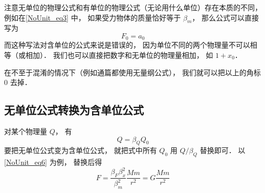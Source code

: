 注意无单位的物理公式和有单位的物理公式（无论用什么单位）存在本质的不同， 例如在\autoref{NoUnit_eq3} 中， 如果受力物体的质量恰好等于 $\beta_m$， 那么公式可以直接写为
\begin{equation}\label{NoUnit_eq7}
F_0 = a_0
\end{equation}
而这种写法对含单位的公式来说是错误的， 因为单位不同的两个物理量不可以相等（或相加）． 我们也可以直接把数字和无单位的物理量相加， 如 $1 + x_0$．

在不至于混淆的情况下（例如通篇都使用无量纲公式）， 我们就可以把以上的角标 $0$ 去掉．

\subsection{无单位公式转换为含单位公式}
对某个物理量 $Q$， 有
\begin{equation}
Q = \beta_Q Q_0
\end{equation}
要把无单位公式变为含单位公式， 就把式中所有 $Q_0$ 用 $Q/\beta_Q$ 替换即可． 以\autoref{NoUnit_eq6} 为例， 替换后得
\begin{equation}
F = \frac{\beta_F\beta_x^2}{\beta_m^2} \frac{Mm}{r^2} = G\frac{Mm}{r^2}
\end{equation}

